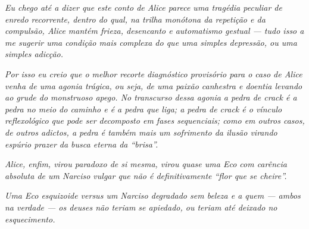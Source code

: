 \emph{Eu chego até a dizer que este conto de Alice parece uma tragédia
peculiar de enredo recorrente, dentro do qual, na trilha monótona da
repetição e da compulsão, Alice mantém frieza, desencanto e automatismo gestual --- tudo isso a me sugerir uma condição mais complexa do que
uma simples depressão, ou uma simples adicção.}

\emph{Por isso eu creio que o melhor recorte diagnóstico provisório para
o caso de Alice venha de uma agonia trágica, ou seja, de uma paixão
canhestra e doentia levando ao grude do monstruoso apego. No transcurso
dessa agonia a pedra de crack é a pedra no meio do caminho e é a pedra
que liga; a pedra de crack é o vínculo reflexológico que pode ser
decomposto em fases sequenciais; como em outros casos, de outros
adictos, a pedra é também mais um sofrimento da ilusão virando espúrio
prazer da busca eterna da ``brisa''.}

\emph{Alice, enfim, virou paradoxo de si mesma, virou quase uma Eco com
carência absoluta de um Narciso vulgar que não é definitivamente ``flor
que se cheire''.}

\emph{Uma Eco esquizoide versus um Narciso degradado sem beleza e a quem
--- ambos na verdade --- os deuses não teriam se apiedado, ou teriam até
deixado no esquecimento. ~}
\endgroup